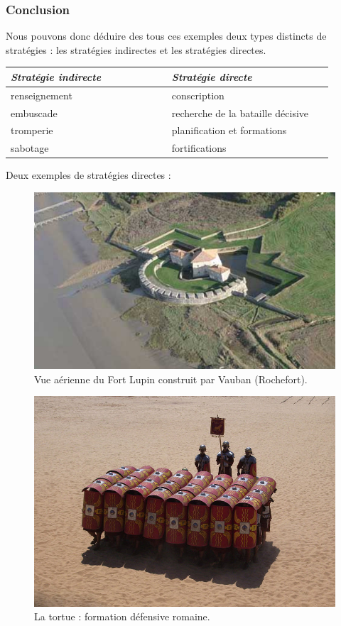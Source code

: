 \documentclass{article}
\begin{document}
\subsubsection{Conclusion}
Nous pouvons donc déduire des tous ces exemples deux types distincts de stratégies : les stratégies indirectes et les stratégies directes.

\bigskip
\begin{tabular}{|p{0.45\linewidth}|p{0.45\linewidth}|}
\hline
\emph{Stratégie indirecte} & \emph{Stratégie directe}\\
\hline
renseignement & conscription\\
embuscade & recherche de la bataille décisive\\
tromperie & planification et formations\\
sabotage & fortifications\\
\hline
\end{tabular}

\bigskip
Deux exemples de stratégies directes :
\begin{figure}[H]
	\begin{centering}
	\includegraphics[width=0.8\linewidth]{../ressources/Vauban_Fort_Lupin}
	\caption{Vue aérienne du Fort Lupin construit par Vauban (Rochefort). \cite{fort_lupin}}
	\end{centering}
\end{figure}
\begin{figure}[H]
	\begin{centering}
	\includegraphics[width=\linewidth]{../ressources/tortue}
	\caption{La tortue : formation défensive romaine. \cite{turtle_form}}
	\end{centering}
\end{figure}
\end{document}
